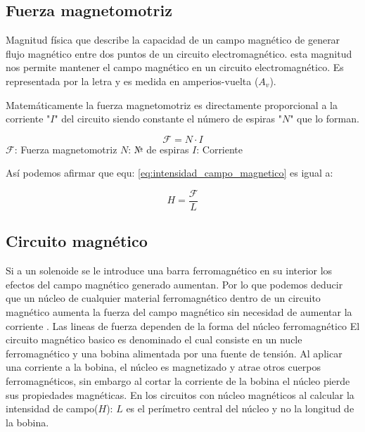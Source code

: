 \documentclass{report}
\begin{document}
  \subsection{Fuerza magnetomotriz }\label{ssec:fuerza_magnetomotriz}
Magnitud física que describe la capacidad de un campo magnético de generar flujo magnético entre dos puntos de un circuito electromagnético.
esta magnitud nos permite mantener el campo magnético en un circuito electromagnético. Es representada por la letra 
y es medida en amperios-vuelta (\( A_v \)). 


\bigskip\begin{flushleft}
Matemáticamente la fuerza magnetomotriz es directamente proporcional a la corriente "\(I\)" del circuito siendo constante 
el número de espiras "\(N\)" que lo forman.
\end{flushleft}
  \begin{center}\[
  \mathcal{F} = N \cdot I
\]\label{eq:fuerza_magnetomotriz}
  \(\mathcal{F}\): Fuerza magnetomotriz \hspace{1.5cm} \(N\): № de espiras \hspace{1.5cm} \(I\): Corriente
  
\end{center}
\vspace{1.5em}
Así podemos afirmar que equ: \ref{eq:intensidad_campo_magnetico} es igual a:
\begin{center}
  \[
    H = \frac{\mathcal{F}}{L}
  \]
\end{center}
\newpage
  \subsection{Circuito magnético }\label{ssec:circuito_magnético}
Si a un solenoide se le introduce una barra ferromagnético en su interior 
los efectos del campo magnético generado aumentan. Por lo que podemos deducir 
que un núcleo de cualquier material ferromagnético dentro de un circuito magnético aumenta la fuerza del campo magnético
sin necesidad de aumentar la corriente . Las lineas de fuerza dependen de la forma del núcleo ferromagnético
\vspace{1.5em}\newline
El circuito magnético basico es denominado  el cual consiste en un nucle ferromagnético y 
una bobina alimentada por una fuente de tensión. Al aplicar una corriente a la bobina, el núcleo es magnetizado
y atrae otros cuerpos ferromagnéticos, sin embargo al cortar la corriente de la bobina el núcleo pierde sus propiedades
magnéticas. 
\vspace{1.5em}\newline
En los circuitos con núcleo magnéticos al calcular la intensidad de campo(\(H\)): \(L\) es el perímetro central del núcleo y no 
la longitud de la bobina.
\vspace{1.5em}
\end{document}
